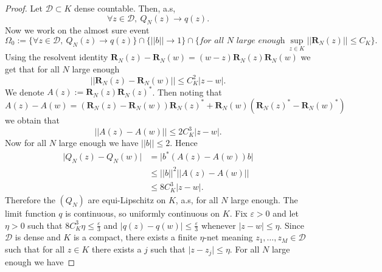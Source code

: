 \documentclass[12pt,a4paper]{amsart}
\theoremstyle{plain} %
\begin{document}
 \begin{proof}
     Let $\mathcal{D}\subset K$ dense countable. Then, a.s, 
     \begin{equation*}
         \forall z \in \mathcal{D}, \ Q_N(z)\rightarrow q(z). 
     \end{equation*}
     Now we work on the almost sure event 
     \begin{equation*}
         \Omega_0:=\{ \forall z \in \mathcal{D}, \ Q_N(z)\rightarrow q(z)\}\cap\{\lvert \lvert b\lvert \lvert \rightarrow1\}\cap \{\textit{for all $N$ large enough} \  \sup_{z\in K}\lvert \lvert \mathbf{R}_{N}(z)\lvert \lvert \leq C_K\}.
     \end{equation*}
     Using the resolvent identity $\mathbf{R}_{N}(z)-\mathbf{R}_{N}(w)=(w-z)\mathbf{R}_{N}(z)\mathbf{R}_{N}(w)$ we get that for all $N$ large enough 
     \begin{equation*}
         \lvert \lvert \mathbf{R}_{N}(z)-\mathbf{R}_{N}(w) \lvert \lvert \leq C_K^2 \lvert z-w \lvert.
     \end{equation*}
     We denote $A(z):=\mathbf{R}_{N}(z)\mathbf{R}_{N}(z)^*$. Then noting that 
     \begin{equation*}
         A(z) -A(w)= (\mathbf{R}_{N}(z)-\mathbf{R}_{N}(w))\mathbf{R}_{N}(z)^* + \mathbf{R}_{N}(w)(\mathbf{R}_{N}(z)^*-\mathbf{R}_{N}(w)^*)
     \end{equation*}
     we obtain that 
     \begin{equation*}
         \lvert \lvert A(z) -A(w) \lvert \lvert \leq 2C_K^3 \lvert z-w\lvert.
     \end{equation*}
     Now for all $N$ large enough we have $\lvert \lvert b \lvert \lvert \leq 2$. Hence 
     \begin{align*}
         \lvert Q_N(z)-Q_N(w)\lvert &=\lvert b^*(A(z)-A(w))b\lvert \\
         &\leq \lvert \lvert b\lvert \lvert^2 \lvert \lvert A(z)-A(w)\lvert \lvert \\
         &\leq 8C_K^3 \lvert z -w \lvert.
     \end{align*}
     Therefore the $(Q_N)$ are equi-Lipschitz on $K$, a.s, for all $N$ large enough. The limit function $q$ is continuous, so uniformly continuous on $K$. Fix $\varepsilon>0$ and let $\eta>0$ such that $8C_K^3\eta\leq \frac{\varepsilon}{3}$ and $\lvert q(z)-q(w) \lvert \leq \frac{\varepsilon}{3}$ whenever $\lvert z-w\lvert \leq \eta$.
     Since $\mathcal{D}$ is dense and $K$ is a compact, there exists a finite $\eta$-net meaning $z_1,\ldots,z_M\in \mathcal{D}$ such that for all $z\in K$ there exists a $j$ such that $\lvert z- z_j\lvert \leq \eta.$ For all $N$ large enough we have 

\end{proof}
\end{document}
